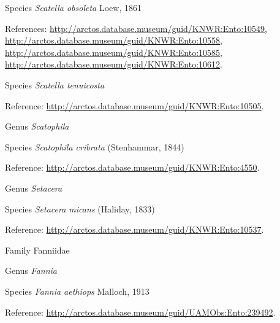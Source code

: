 \documentclass[9pt, article]{memoir}
\begin{document}
\begin{multicols}{2}
\vspace{6pt}\noindent\hspace{36pt}Species \textit{Scatella obsoleta} Loew, 1861


\vspace{6pt}References: 
\url{http://arctos.database.museum/guid/KNWR:Ento:10549}, 
\url{http://arctos.database.museum/guid/KNWR:Ento:10558}, 
\url{http://arctos.database.museum/guid/KNWR:Ento:10585}, 
\url{http://arctos.database.museum/guid/KNWR:Ento:10612}.

\vspace{6pt}\noindent\hspace{36pt}Species \textit{Scatella tenuicosta}


\vspace{6pt}Reference: 
\url{http://arctos.database.museum/guid/KNWR:Ento:10505}.

\vspace{6pt}\noindent\hspace{30pt}Genus \textit{Scatophila}


\vspace{6pt}\noindent\hspace{36pt}Species \textit{Scatophila cribrata} (Stenhammar, 1844)


\vspace{6pt}Reference: 
\url{http://arctos.database.museum/guid/KNWR:Ento:4550}.

\vspace{6pt}\noindent\hspace{30pt}Genus \textit{Setacera}


\vspace{6pt}\noindent\hspace{36pt}Species \textit{Setacera micans} (Haliday, 1833)


\vspace{6pt}Reference: 
\url{http://arctos.database.museum/guid/KNWR:Ento:10537}.

\vspace{6pt}\noindent\hspace{24pt}Family Fanniidae


\vspace{6pt}\noindent\hspace{30pt}Genus \textit{Fannia}


\vspace{6pt}\noindent\hspace{36pt}Species \textit{Fannia aethiops} Malloch, 1913


\vspace{6pt}Reference: 
\url{http://arctos.database.museum/guid/UAMObs:Ento:239492}.


\end{multicols}
\end{document}
